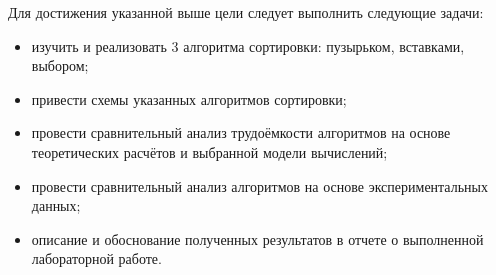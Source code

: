 Для достижения указанной выше цели следует выполнить следующие задачи:
\begin{itemize}
	\item изучить и реализовать 3 алгоритма сортировки: пузырьком, вставками, выбором;
	\item привести схемы указанных алгоритмов сортировки;
	\item провести сравнительный анализ трудоёмкости алгоритмов на основе теоретических расчётов и выбранной модели вычислений;
	\item провести сравнительный анализ алгоритмов на основе экспериментальных данных;
	\item описание и обоснование полученных результатов в отчете о выполненной лабораторной работе.
\end{itemize}

